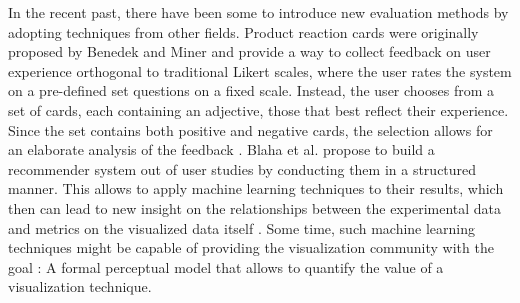 In the recent past, there have been some  to introduce new evaluation methods by adopting techniques from other fields.
Product reaction cards were originally proposed by Benedek and Miner \cite{Benedek:2003:Desirability} and provide a way to collect feedback on user experience orthogonal to traditional Likert scales, where the user rates the system on a pre-defined set questions on a fixed scale.
Instead, the user chooses from a set of cards, each containing an adjective, those that best reflect their experience.
Since the set contains both positive and negative cards, the selection allows for an elaborate analysis of the feedback \cite{Barnum:2010:MoreThanAFeeling, Mercun:2014:ReactionCards}.
Blaha et al. propose to build a recommender system out of user studies by conducting them in a structured manner.
This allows to apply machine learning techniques to their results, which then can lead to new insight on the relationships between the experimental data and metrics on the visualized data itself \cite{Blaha:2014:RecommenderSystem}.
Some time, such machine learning techniques might be capable of providing the visualization community with the goal :
A formal perceptual model that allows to quantify the value of a visualization technique.

